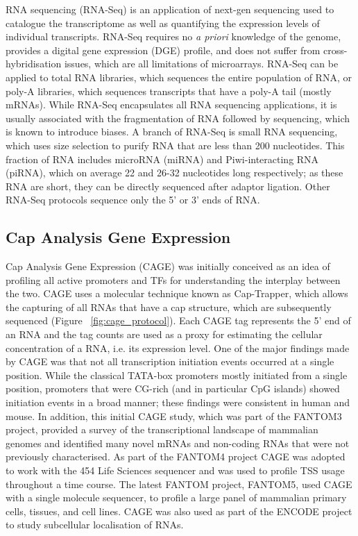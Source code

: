 RNA sequencing (RNA-Seq) is an application of next-gen sequencing used to catalogue the transcriptome as well as quantifying the expression levels of individual transcripts\cite{pmid19015660}. RNA-Seq requires no \textit{a priori} knowledge of the genome, provides a digital gene expression (DGE) profile, and does not suffer from cross-hybridisation issues, which are all limitations of microarrays. RNA-Seq can be applied to total RNA libraries, which sequences the entire population of RNA, or poly-A libraries, which sequences transcripts that have a poly-A tail (mostly mRNAs). While RNA-Seq encapsulates all RNA sequencing applications, it is usually associated with the fragmentation of RNA followed by sequencing, which is known to introduce biases\cite{pmid18516045}. A branch of RNA-Seq is small RNA sequencing, which uses size selection to purify RNA that are less than 200 nucleotides. This fraction of RNA includes microRNA (miRNA) and Piwi-interacting RNA (piRNA), which on average 22 and 26-32 nucleotides long respectively; as these RNA are short, they can be directly sequenced after adaptor ligation. Other RNA-Seq protocols sequence only the 5'\cite{pmid15300261,pmid14663149} or 3'\cite{pmid22454233} ends of RNA.

\subsection{Cap Analysis Gene Expression}

Cap Analysis Gene Expression (CAGE) was initially conceived as an idea of profiling all active promoters and TFs for understanding the interplay between the two\cite{carninci2010capanalysis}. CAGE uses a molecular technique known as Cap-Trapper\cite{pmid8938445,pmid9179497}, which allows the capturing of all RNAs that have a cap structure, which are subsequently sequenced (Figure ~\ref{fig:cage_protocol}). Each CAGE tag represents the 5' end of an RNA and the tag counts are used as a proxy for estimating the cellular concentration of a RNA, i.e. its expression level. One of the major findings made by CAGE was that not all transcription initiation events occurred at a single position\cite{pmid16645617}. While the classical TATA-box promoters mostly initiated from a single position, promoters that were CG-rich (and in particular CpG islands) showed initiation events in a broad manner; these findings were consistent in human and mouse\cite{pmid16645617}. In addition, this initial CAGE study, which was part of the FANTOM3 project, provided a survey of the transcriptional landscape of mammalian genomes and identified many novel mRNAs and non-coding RNAs that were not previously characterised\cite{pmid16141072}. As part of the FANTOM4 project CAGE was adopted to work with the 454 Life Sciences sequencer and was used to profile TSS usage throughout a time course. The latest FANTOM project, FANTOM5, used CAGE with a single molecule sequencer, to profile a large panel of mammalian primary cells, tissues, and cell lines\cite{pmid24670764}. CAGE was also used as part of the ENCODE project to study subcellular localisation of RNAs\cite{pmid22955620}.

